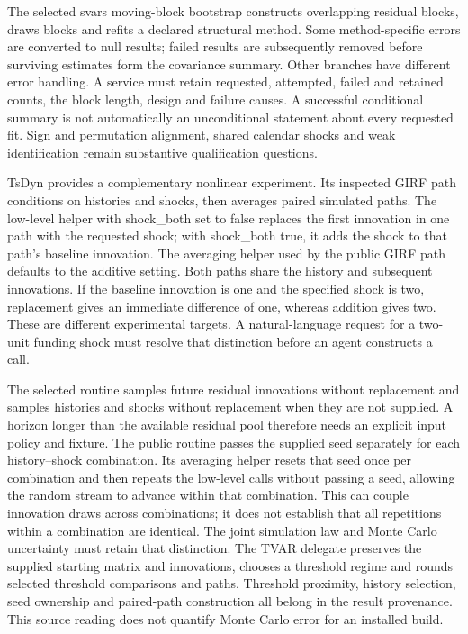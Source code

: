 The selected svars moving-block bootstrap constructs overlapping residual blocks, draws blocks and refits a declared structural method. Some method-specific errors are converted to null results; failed results are subsequently removed before surviving estimates form the covariance summary. Other branches have different error handling. A service must retain requested, attempted, failed and retained counts, the block length, design and failure causes. A successful conditional summary is not automatically an unconditional statement about every requested fit. Sign and permutation alignment, shared calendar shocks and weak identification remain substantive qualification questions.~\citep{exec25_rdyn_svars}

TsDyn provides a complementary nonlinear experiment. Its inspected GIRF path conditions on histories and shocks, then averages paired simulated paths. The low-level helper with shock\_both set to false replaces the first innovation in one path with the requested shock; with shock\_both true, it adds the shock to that path's baseline innovation. The averaging helper used by the public GIRF path defaults to the additive setting. Both paths share the history and subsequent innovations. If the baseline innovation is one and the specified shock is two, replacement gives an immediate difference of one, whereas addition gives two. These are different experimental targets. A natural-language request for a two-unit funding shock must resolve that distinction before an agent constructs a call.~\citep{exec25_rdyn_tsdyn,exec25_rdyn_choice}

The selected routine samples future residual innovations without replacement and samples histories and shocks without replacement when they are not supplied. A horizon longer than the available residual pool therefore needs an explicit input policy and fixture. The public routine passes the supplied seed separately for each history--shock combination. Its averaging helper resets that seed once per combination and then repeats the low-level calls without passing a seed, allowing the random stream to advance within that combination. This can couple innovation draws across combinations; it does not establish that all repetitions within a combination are identical. The joint simulation law and Monte Carlo uncertainty must retain that distinction. The TVAR delegate preserves the supplied starting matrix and innovations, chooses a threshold regime and rounds selected threshold comparisons and paths. Threshold proximity, history selection, seed ownership and paired-path construction all belong in the result provenance. This source reading does not quantify Monte Carlo error for an installed build.~\citep{exec25_rdyn_tsdyn}

